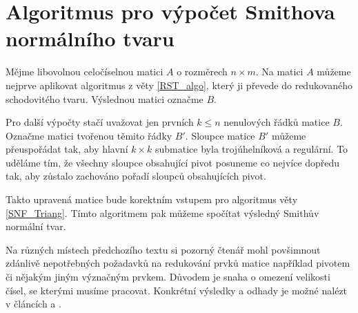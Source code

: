\section{Algoritmus pro výpočet Smithova normálního tvaru}
Mějme libovolnou celočíselnou matici $ A $ o rozměrech $ n \times m $. Na matici
$ A $ můžeme nejprve aplikovat algoritmus z věty \ref{RST_algo}, který ji
převede do redukovaného schodovitého tvaru. Výslednou matici označme $ B $.

Pro další výpočty stačí uvažovat jen prvních $ k \leq n $ nenulových řádků
matice $ B $. Označme matici tvořenou těmito řádky $ B' $. Sloupce
matice $ B' $ můžeme přeuspořádat tak, aby hlavní $ k \times k $
submatice byla trojúhelníková a regulární. To uděláme tím, že všechny sloupce
obsahující pivot posuneme co nejvíce dopředu tak, aby zůstalo zachováno pořadí
sloupců obsahujících pivot.

Takto upravená matice bude korektním vstupem pro algoritmus věty
\ref{SNF_Triang}. Tímto algoritmem pak můžeme spočítat výsledný Smithův normální
tvar.

\begin{pozn}
Na různých místech předchozího textu si pozorný čtenář mohl povšimnout zdánlivě
nepotřebných požadavků na redukování prvků matice například pivotem či nějakým
jiným význačným prvkem. Důvodem je snaha o omezení velikosti čísel, se kterými
musíme pracovat. Konkrétní výsledky a odhady je možné nalézt v článcích
\cite{triang} a \cite{SNF_Arne}.
\end{pozn}
